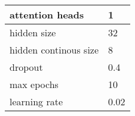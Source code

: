 \begin{tabular}{|p{4cm}|p{2cm}|}
    \hline
    attention heads & 1 \\ \hline
    hidden size & 32 \\ \hline
    hidden continous size & 8 \\ \hline
    dropout & 0.4 \\ \hline
    max epochs & 10 \\ \hline
    learning rate & 0.02 \\ \hline
\end{tabular}
